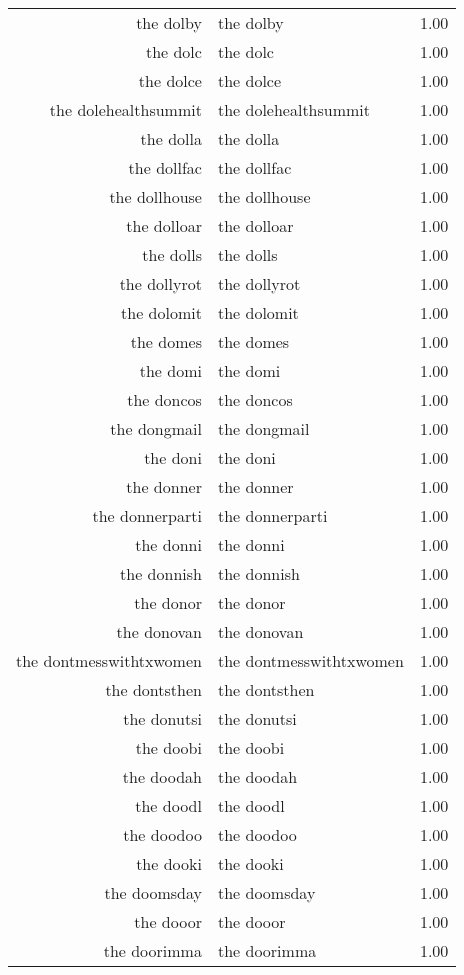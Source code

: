\begin{table}[ht]
\begin{tabular}{rlr}
  the dolby & the dolby & 1.00 \\ 
  the dolc & the dolc & 1.00 \\ 
  the dolce & the dolce & 1.00 \\ 
  the dolehealthsummit & the dolehealthsummit & 1.00 \\ 
  the dolla & the dolla & 1.00 \\ 
  the dollfac & the dollfac & 1.00 \\ 
  the dollhouse & the dollhouse & 1.00 \\ 
  the dolloar & the dolloar & 1.00 \\ 
  the dolls & the dolls & 1.00 \\ 
  the dollyrot & the dollyrot & 1.00 \\ 
  the dolomit & the dolomit & 1.00 \\ 
  the domes & the domes & 1.00 \\ 
  the domi & the domi & 1.00 \\ 
  the doncos & the doncos & 1.00 \\ 
  the dongmail & the dongmail & 1.00 \\ 
  the doni & the doni & 1.00 \\ 
  the donner & the donner & 1.00 \\ 
  the donnerparti & the donnerparti & 1.00 \\ 
  the donni & the donni & 1.00 \\ 
  the donnish & the donnish & 1.00 \\ 
  the donor & the donor & 1.00 \\ 
  the donovan & the donovan & 1.00 \\ 
  the dontmesswithtxwomen & the dontmesswithtxwomen & 1.00 \\ 
  the dontsthen & the dontsthen & 1.00 \\ 
  the donutsi & the donutsi & 1.00 \\ 
  the doobi & the doobi & 1.00 \\ 
  the doodah & the doodah & 1.00 \\ 
  the doodl & the doodl & 1.00 \\ 
  the doodoo & the doodoo & 1.00 \\ 
  the dooki & the dooki & 1.00 \\ 
  the doomsday & the doomsday & 1.00 \\ 
  the dooor & the dooor & 1.00 \\ 
  the doorimma & the doorimma & 1.00 \\ 

\end{tabular}
\end{table}
